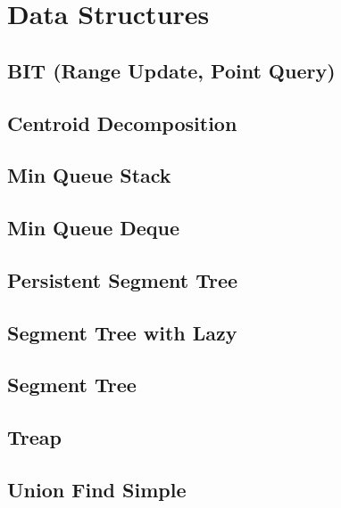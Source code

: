 \section{Data Structures}
\subsection{BIT (Range Update, Point Query)}
\raggedbottom
\hrulefill
\subsection{Centroid Decomposition}
\raggedbottom
\hrulefill
\subsection{Min Queue Stack}
\raggedbottom
\hrulefill
\subsection{Min Queue Deque}
\raggedbottom
\hrulefill
\subsection{Persistent Segment Tree}
\raggedbottom
\hrulefill
\subsection{Segment Tree with Lazy}
\raggedbottom
\hrulefill
\subsection{Segment Tree}
\raggedbottom
\hrulefill
\subsection{Treap}
\raggedbottom
\hrulefill
\subsection{Union Find Simple}
\raggedbottom
\hrulefill
